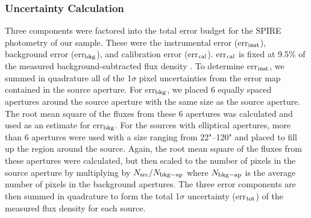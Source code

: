 \subsubsection{Uncertainty Calculation}
Three components were factored into the total error budget for the SPIRE photometry of our sample. These were the instrumental error (err$_{\rm{inst}}$), background error (err$_{\rm{bkg}}$), and calibration error (err$_{\rm{cal}}$). err$_{\rm{cal}}$ is fixed at 9.5\% of the measured background-subtracted flux density \citep{Bendo:2013sd}. To determine err$_{\rm{inst}}$, we summed in quadrature all of the 1$\sigma$ pixel uncertainties from the error map contained in the source aperture. For err$_{\rm{bkg}}$, we placed 6 equally spaced apertures around the source aperture with the same size as the source aperture. The root mean square of the fluxes from these 6 apertures was calculated and used as an estimate for err$_{\rm{bkg}}$. For the sources with elliptical apertures, more than 6 apertures were used with a size ranging from 22"--120" and placed to fill up the region around the source. Again, the root mean square of the fluxes from these apertures were calculated, but then scaled to the number of pixels in the source aperture by multiplying by $N_{\rm{src}}/{N_{\rm{bkg-ap}}}$ where $N_{\rm{bkg-ap}}$ is the average number of pixels in the background apertures. The three error components are then summed in quadrature to form the total 1$\sigma$ uncertainty (err$_{\rm{tot}}$) of the measured flux density for each source.